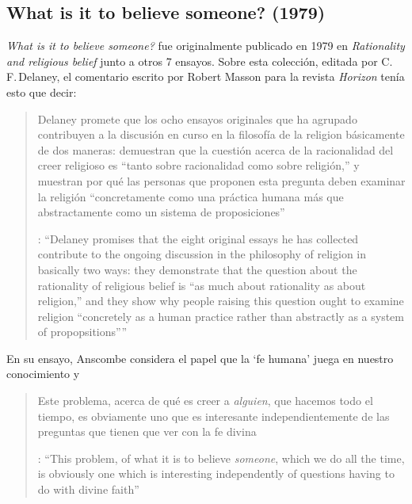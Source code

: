 \subsection{What is it to believe someone? (1979)}

\emph{What is it to believe someone?} fue originalmente publicado en 1979 en \emph{Rationality and religious belief} junto a otros 7 ensayos. Sobre esta colección, editada por C.\,F.\,Delaney, el comentario escrito por Robert Masson para la revista \emph{Horizon} tenía esto que decir: \blockquote[{\cite[440]{masson1981}}: \enquote{Delaney promises that the eight original essays he has collected \textelp{} contribute to the ongoing discussion in the philosophy of religion in basically two ways: they demonstrate that the question about the rationality of religious belief is ``as much about rationality as about religion,'' and they show why people raising this question ought to examine religion ``concretely as a human practice rather than abstractly as a system of propopsitions''}]{Delaney promete que los ocho ensayos originales que ha agrupado \textelp{} contribuyen a la discusión en curso en la filosofía de la religion básicamente de dos maneras: demuestran que la cuestión acerca de la racionalidad del creer religioso es ``tanto sobre racionalidad como sobre religión,'' y muestran por qué las personas que proponen esta pregunta deben examinar la religión ``concretamente como una práctica humana más que abstractamente como un sistema de proposiciones''}. En su ensayo, Anscombe considera el papel que la `fe humana' juega en nuestro conocimiento y \blockquote[{\cite[xvii]{anscombe2008faith}}: \enquote{This problem, of what it is to believe \emph{someone}, which we do all the time, is obviously one which is interesting independently of questions having to do with divine faith}]{Este problema, acerca de qué es creer a \emph{alguien}, que hacemos todo el tiempo, es obviamente uno que es interesante independientemente de las preguntas que tienen que ver con la fe divina}.

